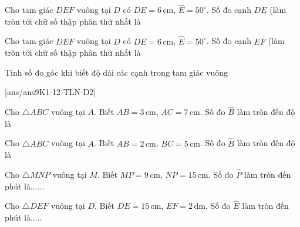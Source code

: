 \begin{ex}%
	Cho tam giác $DEF$ vuông tại $D$ có $DE=6\,\text{cm}$, $\widehat{E}=50^{\circ}$. Số đo cạnh $DE$ (làm tròn tới chữ số thập phân thứ nhất là
\end{ex}
\begin{ex}%
	Cho tam giác $DEF$ vuông tại $D$ có $DE=6\,\text{cm}$, $\widehat{E}=50^{\circ}$. Số đo cạnh $EF$ (làm tròn tới chữ số thập phân thứ nhất là
\end{ex}
\begin{dang}{Tính số đo góc khi biết độ dài các cạnh trong tam giác vuông}
\end{dang}
[ans/ans9K1-12-TLN-D2]
\begin{ex}%
	Cho $\triangle ABC$ vuông tại $A$. Biết $AB=3\,\text{cm}$, $AC=7\,\text{cm}$. Số đo $\widehat{B}$ làm tròn đến độ là
\end{ex}
\begin{ex}%
	Cho $\triangle ABC$ vuông tại $A$. Biết $AB=2\,\text{cm}$, $BC=5\,\text{cm}$. Số đo $\widehat{B}$ làm tròn đến độ là
\end{ex}
\begin{ex}%
	Cho $\triangle MNP$ vuông tại $M$. Biết $MP=9\,\text{cm}$, $NP=15\,\text{cm}$. Số đo $\widehat{P}$ làm tròn đến phút là......
\end{ex}
\begin{ex}%
	Cho $\triangle DEF$ vuông tại $D$. Biết $DE=15\,\text{cm}$, $EF=2\,\text{dm}$. Số đo $\widehat{E}$ làm tròn đến phút là.....
\end{ex}
